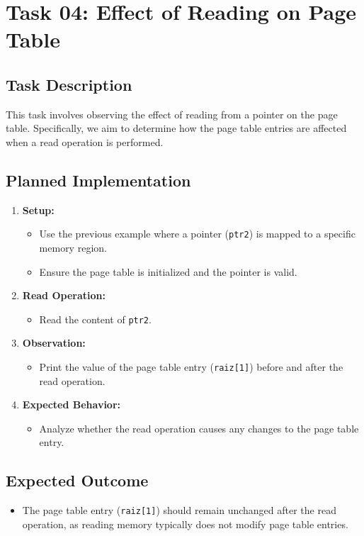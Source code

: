 \documentclass[a4paper,12pt]{report}
\begin{document}
\chapter{Task 04: Effect of Reading on Page Table}

\section{Task Description}
This task involves observing the effect of reading from a pointer on the page table. Specifically, we aim to determine how the page table entries are affected when a read operation is performed.

\section{Planned Implementation}
\begin{enumerate}
    \item \textbf{Setup:}
    \begin{itemize}
        \item Use the previous example where a pointer (\texttt{ptr2}) is mapped to a specific memory region.
        \item Ensure the page table is initialized and the pointer is valid.
    \end{itemize}
    \item \textbf{Read Operation:}
    \begin{itemize}
        \item Read the content of \texttt{ptr2}.
    \end{itemize}
    \item \textbf{Observation:}
    \begin{itemize}
        \item Print the value of the page table entry (\texttt{raiz[1]}) before and after the read operation.
    \end{itemize}
    \item \textbf{Expected Behavior:}
    \begin{itemize}
        \item Analyze whether the read operation causes any changes to the page table entry.
    \end{itemize}
\end{enumerate}

\section{Expected Outcome}
\begin{itemize}
    \item The page table entry (\texttt{raiz[1]}) should remain unchanged after the read operation, as reading memory typically does not modify page table entries.
\end{itemize}
\end{document}
